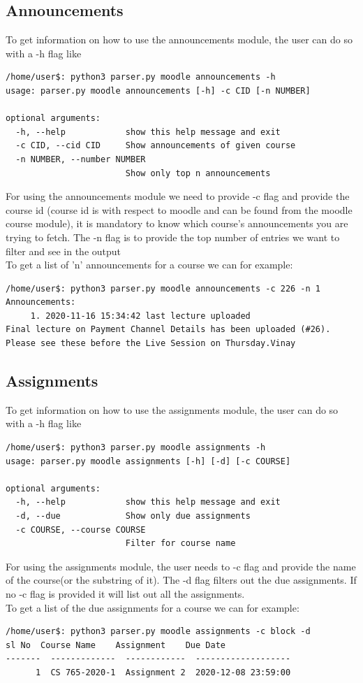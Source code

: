 \documentclass[12pt, letterpaper, twoside]{article}
\begin{document}
\subsection{Announcements}
To get information on how to use the announcements module, the user can do so with a -h flag like 
\begin{verbatim}
/home/user$: python3 parser.py moodle announcements -h
usage: parser.py moodle announcements [-h] -c CID [-n NUMBER]

optional arguments:
  -h, --help            show this help message and exit
  -c CID, --cid CID     Show announcements of given course
  -n NUMBER, --number NUMBER
                        Show only top n announcements
\end{verbatim}
For using the announcements module we need to provide -c flag and provide the course id (course id is with respect to moodle and can be found from the moodle course module), it is mandatory to know which course's announcements you are trying to fetch. The -n flag is to provide the top number of entries we want to filter and see in the output\\
To get a list of 'n' announcements for a course we can for example:
\begin{verbatim}
/home/user$: python3 parser.py moodle announcements -c 226 -n 1
Announcements:
	 1. 2020-11-16 15:34:42 last lecture uploaded
Final lecture on Payment Channel Details has been uploaded (#26). 
Please see these before the Live Session on Thursday.Vinay
\end{verbatim}

\subsection{Assignments}
To get information on how to use the assignments module, the user can do so with a -h flag like 
\begin{verbatim}
/home/user$: python3 parser.py moodle assignments -h
usage: parser.py moodle assignments [-h] [-d] [-c COURSE]

optional arguments:
  -h, --help            show this help message and exit
  -d, --due             Show only due assignments
  -c COURSE, --course COURSE
                        Filter for course name
\end{verbatim}
For using the assignments module, the user needs to -c flag and provide the name of the course(or the substring of it). The -d flag filters out the due assignments. If no -c flag is provided it will list out all the assignments.\\
To get a list of the due assignments for a course we can for example:
\begin{verbatim}
/home/user$: python3 parser.py moodle assignments -c block -d
sl No  Course Name    Assignment    Due Date
-------  -------------  ------------  -------------------
      1  CS 765-2020-1  Assignment 2  2020-12-08 23:59:00
\end{verbatim}
\end{document}
